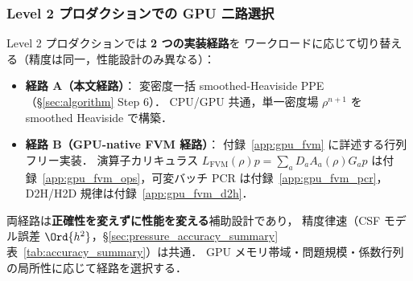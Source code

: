 \subsubsection{Level 2 プロダクションでの GPU 二路選択}
\label{sec:level_gpu_dual_path}

Level 2 プロダクションでは \textbf{2 つの実装経路}を
ワークロードに応じて切り替える（精度は同一，性能設計のみ異なる）：

\begin{itemize}[leftmargin=2em]
  \item \textbf{経路 A（本文経路）}：
        変密度一括 smoothed-Heaviside PPE
        （§\ref{sec:algorithm} Step 6）．
        CPU/GPU 共通，単一密度場 $\rho^{n+1}$ を smoothed Heaviside で構築．
  \item \textbf{経路 B（GPU-native FVM 経路）}：
        付録~\ref{app:gpu_fvm} に詳述する行列フリー実装．
        演算子カリキュラス $L_\text{FVM}(\rho)p = \sum_a D_a A_a(\rho) G_a p$
        は付録~\ref{app:gpu_fvm_ops}，可変バッチ PCR は付録~\ref{app:gpu_fvm_pcr}，
        D2H/H2D 規律は付録~\ref{app:gpu_fvm_d2h}．
\end{itemize}

両経路は\textbf{正確性を変えずに性能を変える}補助設計であり，
精度律速（CSF モデル誤差 $\Ord{h^2}$，§\ref{sec:pressure_accuracy_summary} 表~\ref{tab:accuracy_summary}）は共通．
GPU メモリ帯域・問題規模・係数行列の局所性に応じて経路を選択する．

